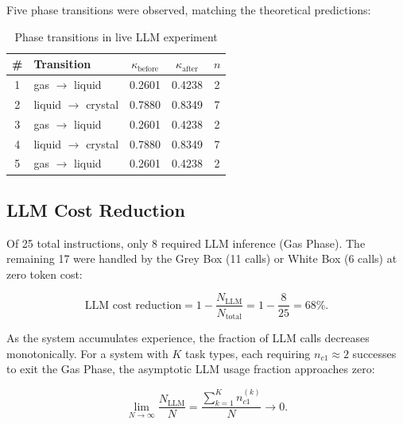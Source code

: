 \documentclass[10pt,twocolumn]{article}
\begin{document}
\vspace{1cm}

Five phase transitions were observed, matching the
theoretical predictions:

\begin{table}[htbp]
\centering
\caption{Phase transitions in live LLM experiment}
\label{tab:llm_transitions}
\begin{tabular}{clccc}
\toprule
\# & Transition & $\kappa_{\text{before}}$ &
  $\kappa_{\text{after}}$ & $n$ \\
\midrule
1 & gas $\to$ liquid    & 0.2601 & 0.4238 & 2 \\
2 & liquid $\to$ crystal & 0.7880 & 0.8349 & 7 \\
3 & gas $\to$ liquid    & 0.2601 & 0.4238 & 2 \\
4 & liquid $\to$ crystal & 0.7880 & 0.8349 & 7 \\
5 & gas $\to$ liquid    & 0.2601 & 0.4238 & 2 \\
\bottomrule
\end{tabular}
\end{table}

\vspace{1cm}

\subsection{LLM Cost Reduction}

Of 25 total instructions, only 8 required LLM inference
(Gas Phase). The remaining 17 were handled by the
Grey Box (11 calls) or White Box (6 calls) at zero
token cost:

\begin{equation}
  \text{LLM cost reduction}
    = 1 - \frac{N_{\text{LLM}}}{N_{\text{total}}}
    = 1 - \frac{8}{25}
    = 68\%.
  \label{eq:cost}
\end{equation}

\noindent As the system accumulates experience, the
fraction of LLM calls decreases monotonically. For a
system with $K$ task types, each requiring
$n_{c1} \approx 2$ successes to exit the Gas Phase,
the asymptotic LLM usage fraction approaches zero:

\begin{equation}
  \lim_{N\to\infty}
    \frac{N_{\text{LLM}}}{N}
    = \frac{\sum_{k=1}^{K} n_{c1}^{(k)}}{N}
    \to 0.
  \label{eq:asymptotic}
\end{equation}

\vspace{1cm}
\end{document}
